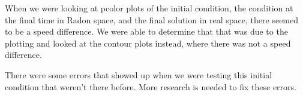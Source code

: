 
When we were looking at pcolor plots of the initial condition, the condition at the final time in Radon space, and the final solution in real space, there seemed to be a speed difference. We were able to determine that that was due to the plotting and looked at the contour plots instead, where there was not a speed difference.

There were some errors that showed up when we were testing this initial condition that weren't there before. More research is needed to fix these errors.